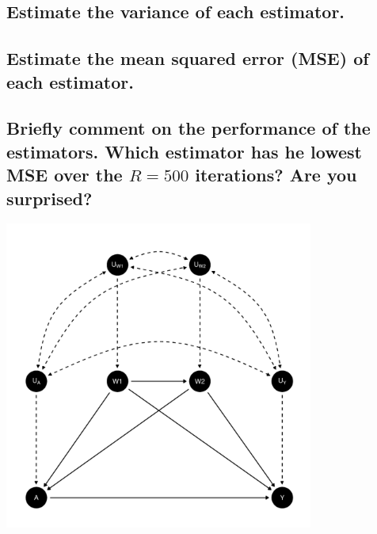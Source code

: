 \documentclass{article}\usepackage[]{graphicx}\usepackage[]{xcolor}
\newenvironment{knitrout}{}{} %
\begin{document}
  \subsection{Estimate the variance of each estimator.}
  
  \subsection{Estimate the mean squared error (MSE) of each estimator.}

  \subsection{Briefly comment on the performance of the estimators. Which estimator has he lowest MSE over the $R=500$ iterations? Are you surprised?}
 
 
 
 
 
 
 
 
 
 
 
 
 
 
 
 
 
 
 
 
 
 
 
 
 
 
 
 
    
\begin{knitrout}
\color{fgcolor}
\includegraphics[width=4in]{figure/unnamed-chunk-2-1} 

\end{knitrout}
      
      
      
\end{document}
